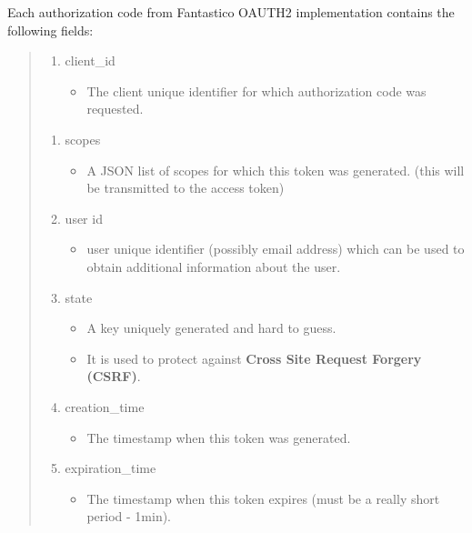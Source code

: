 \documentclass[letterpaper,10pt,english]{sphinxmanual}
\begin{document}
Each authorization code from Fantastico OAUTH2 implementation contains the following fields:
\begin{quote}
\begin{enumerate}
\item {} 
client\_id
\begin{itemize}
\item {} 
The client unique identifier for which authorization code was requested.

\end{itemize}

\end{enumerate}
\begin{enumerate}
\item {} 
scopes
\begin{itemize}
\item {} 
A JSON list of scopes for which this token was generated. (this will be transmitted to the access token)

\end{itemize}

\item {} 
user id
\begin{itemize}
\item {} 
user unique identifier (possibly email address) which can be used to obtain additional information about the user.

\end{itemize}

\item {} 
state
\begin{itemize}
\item {} 
A key uniquely generated and hard to guess.

\item {} 
It is used to protect against \textbf{Cross Site Request Forgery (CSRF)}.

\end{itemize}

\item {} 
creation\_time
\begin{itemize}
\item {} 
The timestamp when this token was generated.

\end{itemize}

\item {} 
expiration\_time
\begin{itemize}
\item {} 
The timestamp when this token expires (must be a really short period - 1min).

\end{itemize}

\end{enumerate}
\end{quote}
\end{document}
